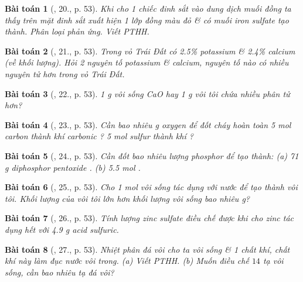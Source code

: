 \documentclass{article}
\newtheorem{baitoan}{Bài toán}
\begin{document}
\begin{baitoan}[\cite{An_Hoa_Hoc_nang_cao_8_9}, 20., p. 53]
	Khi cho 1 chiếc đinh sắt vào dung dịch muối đồng ta thấy trên mặt đinh sắt xuất hiện 1 lớp đồng màu đỏ \& có muối iron sulfate tạo thành. Phân loại phản ứng. Viết {\rm PTHH}.
\end{baitoan}

\begin{baitoan}[\cite{An_Hoa_Hoc_nang_cao_8_9}, 21., p. 53]
	Trong vỏ Trái Đất có {\rm2.5\%} potassium \& {\rm2.4\%} calcium (về khối lượng). Hỏi 2 nguyên tố potassium \& calcium, nguyên tố nào có nhiều nguyên tử hơn trong vỏ Trái Đất.
\end{baitoan}

\begin{baitoan}[\cite{An_Hoa_Hoc_nang_cao_8_9}, 22., p. 53]
	{\rm1 g} vôi sống {\rm CaO} hay {\rm1 g} vôi tôi {\rm{}} chứa nhiều phân tử hơn?
\end{baitoan}

\begin{baitoan}[\cite{An_Hoa_Hoc_nang_cao_8_9}, 23., p. 53]
	Cần bao nhiêu {\rm g} oxygen để đốt cháy hoàn toàn {\rm5 mol} carbon thành khí carbonic {\rm{}? 5 mol} sulfur thành khí {\rm{}}?
\end{baitoan}

\begin{baitoan}[\cite{An_Hoa_Hoc_nang_cao_8_9}, 24., p. 53]
	Cần đốt bao nhiêu lượng phosphor để tạo thành: (a) {\rm71 g} diphosphor pentoxide {\rm{}}. (b) {\rm5.5 mol }.
\end{baitoan}

\begin{baitoan}[\cite{An_Hoa_Hoc_nang_cao_8_9}, 25., p. 53]
	Cho {\rm1 mol} vôi sống tác dụng với nước để tạo thành vôi tôi. Khối lượng của vôi tôi lớn hơn khối lượng vôi sống bao nhiêu {\rm g}?
\end{baitoan}

\begin{baitoan}[\cite{An_Hoa_Hoc_nang_cao_8_9}, 26., p. 53]
	Tính lượng zinc sulfate điều chế được khi cho zinc tác dụng hết với {\rm4.9 g} acid sulfuric.
\end{baitoan}

\begin{baitoan}[\cite{An_Hoa_Hoc_nang_cao_8_9}, 27., p. 53]
	Nhiệt phân đá vôi cho ta vôi sống \& 1 chất khí, chất khí này làm đục nước vôi trong. (a) Viết {\rm PTHH}. (b) Muốn điều chế $14$ tạ vôi sống, cần bao nhiêu tạ đá vôi?
\end{baitoan}
\end{document}
